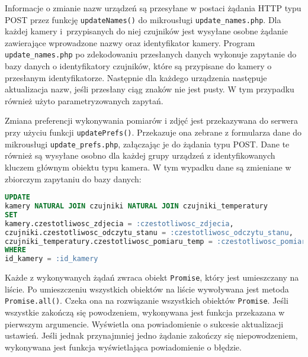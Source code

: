 \documentclass[a4paper,11pt,twoside]{article}
\begin{document}
Informacje o zmianie nazw urządzeń są przesyłane w postaci żądania HTTP typu POST przez funkcję \texttt{updateNames()} do mikrousługi \texttt{update{\_}names.php}. Dla każdej kamery i~przypisanych do niej czujników jest wysyłane osobne żądanie zawierające wprowadzone nazwy oraz identyfikator kamery. Program \texttt{update{\_}names.php} po zdekodowaniu przesłanych danych wykonuje zapytanie do bazy danych o identyfikatory czujników, które są przypisane do kamery o przesłanym identyfikatorze. Następnie dla każdego urządzenia następuje aktualizacja nazw, jeśli przesłany ciąg znaków nie jest pusty. W tym przypadku również użyto parametryzowanych zapytań.

Zmiana preferencji wykonywania pomiarów i zdjęć jest przekazywana do serwera przy użyciu funkcji \texttt{updatePrefs()}. Przekazuje ona zebrane z formularza dane do mikrousługi \texttt{update{\_}prefs.php}, załączając je do żądania typu POST. Dane te również są wysyłane osobno dla każdej grupy urządzeń z identyfikowanych kluczem głównym obiektu typu kamera. W tym wypadku dane są zmieniane w zbiorczym zapytaniu do bazy danych:
\begin{lstlisting}[language=SQL]
UPDATE 
kamery NATURAL JOIN czujniki NATURAL JOIN czujniki_temperatury 
SET 
kamery.czestotliwosc_zdjecia = :czestotliwosc_zdjecia, 
czujniki.czestotliwosc_odczytu_stanu = :czestotliwosc_odczytu_stanu,
czujniki_temperatury.czestotliwosc_pomiaru_temp = :czestotliwosc_pomiaru_temp
WHERE 
id_kamery = :id_kamery
\end{lstlisting}

Każde z wykonywanych żądań zwraca obiekt \texttt{Promise}, który jest umieszczany na liście. Po umieszczeniu wszystkich obiektów na liście wywoływana jest metoda \texttt{Promise.all()}. Czeka ona na rozwiązanie wszystkich obiektów \texttt{Promise}. Jeśli wszystkie zakończą się powodzeniem, wykonywana jest funkcja przekazana w pierwszym argumencie. Wyświetla ona powiadomienie o sukcesie aktualizacji ustawień. Jeśli jednak przynajmniej jedno żądanie zakończy się niepowodzeniem, wykonywana jest funkcja wyświetlająca powiadomienie o błędzie.
\end{document}
